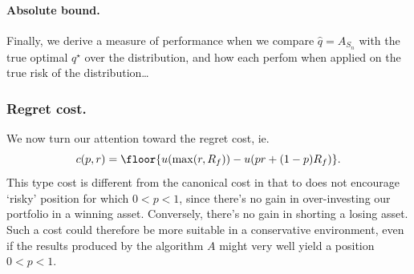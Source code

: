 

















\paragraph{Absolute bound.}
Finally, we derive a measure of performance when we compare $\hat q=A_{S_n}$ with the true
optimal $q^\star$ over the distribution, and how each perfom when applied on the true risk
of the distribution\ldots

\subsubsection{Regret cost.}

We now turn our attention toward the regret cost, ie.
\begin{equation*}
  c(p,r) = \floor{u(\max(r,R_f)) - u(pr + (1-p)R_f)}.
\end{equation*}
This type cost is different from the canonical cost in that to does not encourage `risky'
position for which $0<p<1$, since there's no gain in over-investing our portfolio in a
winning asset. Conversely, there's no gain in shorting a losing asset. Such a cost could
therefore be more suitable in a conservative environment, even if the results produced by
the algorithm $A$ might very well yield a position $0<p<1$.

